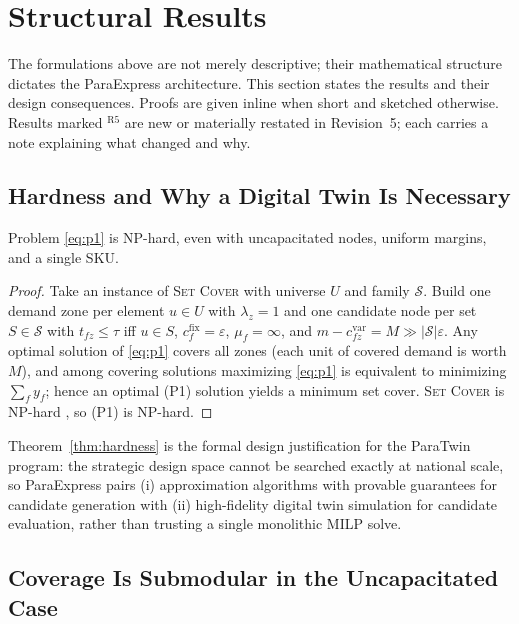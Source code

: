 \section{Structural Results}\label{sec:structural}

The formulations above are not merely descriptive; their mathematical structure dictates the ParaExpress architecture. This section states the results and their design consequences. Proofs are given inline when short and sketched otherwise. Results marked $^{\mathrm{R5}}$ are new or materially restated in Revision~5; each carries a note explaining what changed and why.

\subsection{Hardness and Why a Digital Twin Is Necessary}

\begin{theorem}\label{thm:hardness}
Problem \eqref{eq:p1} is NP-hard, even with uncapacitated nodes, uniform margins, and a single SKU.
\end{theorem}
\begin{proof}
Take an instance of \textsc{Set Cover} with universe $U$ and family $\mathcal{S}$. Build one demand zone per element $u\in U$ with $\lambda_z=1$ and one candidate node per set $S\in\mathcal{S}$ with $t_{fz}\le\tau$ iff $u\in S$, $c^{\mathrm{fix}}_f=\varepsilon$, $\mu_f=\infty$, and $m-c^{\mathrm{var}}_{fz}=M\gg|\mathcal{S}|\varepsilon$. Any optimal solution of \eqref{eq:p1} covers all zones (each unit of covered demand is worth $M$), and among covering solutions maximizing \eqref{eq:p1} is equivalent to minimizing $\sum_fy_f$; hence an optimal (P1) solution yields a minimum set cover. \textsc{Set Cover} is NP-hard \cite{garey1979}, so (P1) is NP-hard.
\end{proof}

\begin{remark}
Theorem~\ref{thm:hardness} is the formal design justification for the ParaTwin program: the strategic design space cannot be searched exactly at national scale, so ParaExpress pairs (i) approximation algorithms with provable guarantees for candidate generation with (ii) high-fidelity digital twin simulation for candidate evaluation, rather than trusting a single monolithic MILP solve.
\end{remark}

\subsection{Coverage Is Submodular in the Uncapacitated Case}

